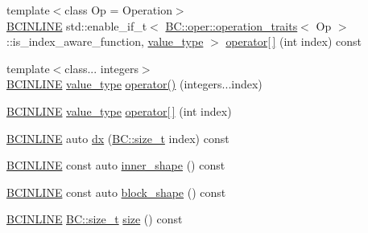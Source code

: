 \begin{DoxyCompactItemize}
\item 
{\footnotesize template$<$class Op  = Operation$>$ }\\\hyperlink{BlackCat__Common_8h_a6699e8b0449da5c0fafb878e59c1d4b1}{B\+C\+I\+N\+L\+I\+NE} std\+::enable\+\_\+if\+\_\+t$<$ \hyperlink{structBC_1_1oper_1_1operation__traits}{B\+C\+::oper\+::operation\+\_\+traits}$<$ Op $>$\+::is\+\_\+index\+\_\+aware\+\_\+function, \hyperlink{structBC_1_1tensors_1_1exprs_1_1Unary__Expression_aeca5642a5f8dcb901d3b91cd60159bf6}{value\+\_\+type} $>$ \hyperlink{structBC_1_1tensors_1_1exprs_1_1Unary__Expression_a5b7edd8b7445437745fb823f6c2744ab}{operator\mbox{[}$\,$\mbox{]}} (int index) const 
\item 
{\footnotesize template$<$class... integers$>$ }\\\hyperlink{BlackCat__Common_8h_a6699e8b0449da5c0fafb878e59c1d4b1}{B\+C\+I\+N\+L\+I\+NE} \hyperlink{structBC_1_1tensors_1_1exprs_1_1Unary__Expression_aeca5642a5f8dcb901d3b91cd60159bf6}{value\+\_\+type} \hyperlink{structBC_1_1tensors_1_1exprs_1_1Unary__Expression_a1cd8c1dfe8431d0762b38b3f72df226d}{operator()} (integers...\+index)
\item 
\hyperlink{BlackCat__Common_8h_a6699e8b0449da5c0fafb878e59c1d4b1}{B\+C\+I\+N\+L\+I\+NE} \hyperlink{structBC_1_1tensors_1_1exprs_1_1Unary__Expression_aeca5642a5f8dcb901d3b91cd60159bf6}{value\+\_\+type} \hyperlink{structBC_1_1tensors_1_1exprs_1_1Unary__Expression_a6c1ae9946de30c193601b2c3b4398540}{operator\mbox{[}$\,$\mbox{]}} (int index)
\item 
\hyperlink{BlackCat__Common_8h_a6699e8b0449da5c0fafb878e59c1d4b1}{B\+C\+I\+N\+L\+I\+NE} auto \hyperlink{structBC_1_1tensors_1_1exprs_1_1Unary__Expression_a16cdc4c2069bcb1351223614e2ddc8f8}{dx} (\hyperlink{namespaceBC_a6007cbc4eeec401a037b558910a56173}{B\+C\+::size\+\_\+t} index) const 
\item 
\hyperlink{BlackCat__Common_8h_a6699e8b0449da5c0fafb878e59c1d4b1}{B\+C\+I\+N\+L\+I\+NE} const auto \hyperlink{structBC_1_1tensors_1_1exprs_1_1Unary__Expression_a17f27962670d21bfeee84274c9b08398}{inner\+\_\+shape} () const 
\item 
\hyperlink{BlackCat__Common_8h_a6699e8b0449da5c0fafb878e59c1d4b1}{B\+C\+I\+N\+L\+I\+NE} const auto \hyperlink{structBC_1_1tensors_1_1exprs_1_1Unary__Expression_a3a6658512471803c3a763eec8060552d}{block\+\_\+shape} () const 
\item 
\hyperlink{BlackCat__Common_8h_a6699e8b0449da5c0fafb878e59c1d4b1}{B\+C\+I\+N\+L\+I\+NE} \hyperlink{namespaceBC_a6007cbc4eeec401a037b558910a56173}{B\+C\+::size\+\_\+t} \hyperlink{structBC_1_1tensors_1_1exprs_1_1Unary__Expression_a8cf67dcebd5e64cf65fcd7196eeaf935}{size} () const 

\end{DoxyCompactItemize}

